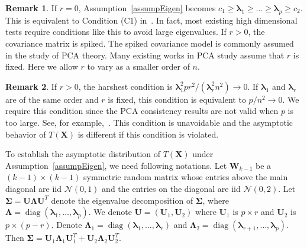 \documentclass[12pt]{article} %
\DeclareMathOperator{\mydiag}{diag}
\newcommand{\bX}{\mathbf{X}}
\newcommand{\bU}{\mathbf{U}}
\newcommand{\bW}{\mathbf{W}}
\newcommand{\bfsym}[1]{\ensuremath{\boldsymbol{#1}}}
\def\blambda {\bfsym {\lambda}}
\def\bLambda {\bfsym {\Lambda}}
\def\bSigma {\bfsym {\Sigma}}
\theoremstyle{definition}
\newtheorem{remark}{Remark}
\begin{document}
\begin{remark}
    If $r=0$, Assumption~\ref{assumpEigen} becomes
    $
   c_1 \geq \blambda_{1} \geq \ldots \geq \blambda_{p} \geq c_2
    $.
    This is equivalent to Condition (C1) in~\cite{Cai2014High}.
    In fact, most existing high dimensional tests require conditions like this to avoid large eigenvalues.
    If $r>0$, the covariance matrix is spiked.
The spiked covariance model is commonly assumed in the study of PCA theory.
Many existing works in PCA study assume that $r$ is fixed.
    Here we allow $r$ to vary as a smaller order of $n$.
\end{remark}
\begin{remark}
    If $r>0$, the harshest condition is $\blambda_1^2 p r^2 /(\blambda_r^2 n^2)\to 0$.
    If $\blambda_1$ and $\blambda_r$ are of the same order and $r$ is fixed, this condition is equivalent to $p/n^2\to 0$.
    We require this condition since the PCA consistency results are not valid when $p$ is too large. See, for example,~\citep{Cai2012Sparse}.
    This condition is unavoidable and the asymptotic behavior of $T(\bX)$ is different if this condition is violated.
\end{remark}


To establish the asymptotic distribution of $T(\bX)$ under Assumption~\ref{assumpEigen},
we need following notations.
Let $\bW_{k-1}$ be a $(k-1)\times(k-1)$ symmetric random matrix whose entries above the main diagonal are iid $\mathcal{N}(0,1)$ and the entries on the diagonal are iid $\mathcal{N}(0,2)$.
Let $\bSigma= \bU\bLambda \bU^T$ denote the eigenvalue decomposition of $\bSigma$, where $\bLambda =\mydiag (\blambda_1,\ldots,\blambda_p)$.
We denote $\bU=(\bU_1,\bU_2)$ where $\bU_1$ is $p\times r$ and $\bU_2$ is $p\times (p-r)$.
Denote $\bLambda_1=\mydiag(\blambda_1,\ldots,\blambda_r)$ and $\bLambda_2=\mydiag(\blambda_{r+1},\ldots,\blambda_p)$.
Then $\bSigma=\bU_1\bLambda_1 \bU_1^T+\bU_2\bLambda_2 \bU_2^T$.
\end{document}
